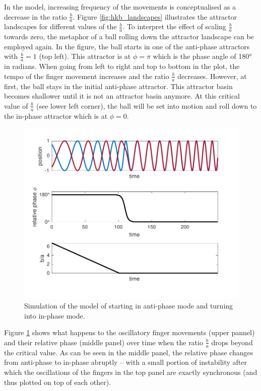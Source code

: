 In the model, increasing frequency of the movements is conceptualised as a decrease in the ratio $\frac{b}{a}$. Figure \ref{fig:hkb_landscapes} illustrates the attractor landscapes for different values of the $\frac{b}{a}$. To interpret the effect of scaling $\frac{b}{a}$ towards zero, the metaphor of a ball rolling down the attractor landscape can be employed again. In the figure, the ball starts in one of the anti-phase attractors with $\frac{b}{a} = 1$ (top left). This attractor is at $\phi = \pi$ which is the phase angle of 180° in radians. When going from left to right and top to bottom in the plot, the tempo of the finger movement increases and the ratio $\frac{b}{a}$ decreases. However, at first, the ball stays in the initial anti-phase attractor. This attractor basin becomes shallower until it is not an attractor basin anymore. At this critical value of $\frac{b}{a}$ (see lower left corner), the ball will be set into motion and roll down to the in-phase attractor which is at $\phi = 0$.

\begin{figure}[b]
	\includegraphics[width=12cm]{figures/ch3/hkb_simulation.pdf}
	\caption{Simulation of the model of \citet{HakenKelsoBunz1985} starting in anti-phase mode and turning into in-phase mode.}
	\label{fig:hkb_simulation}
\end{figure}


Figure \ref{fig:hkb_simulation} shows what happens to the oscillatory finger movements (upper pannel)  and their relative phase (middle panel) over time when the ratio $\frac{b}{a}$ drops beyond the critical value. As can be seen in the middle panel, the relative phase changes from anti-phase to in-phase abruptly -- with a small portion of instability after which the oscillations of the fingers in the top panel are exactly synchronous (and thus plotted on top of each other).

